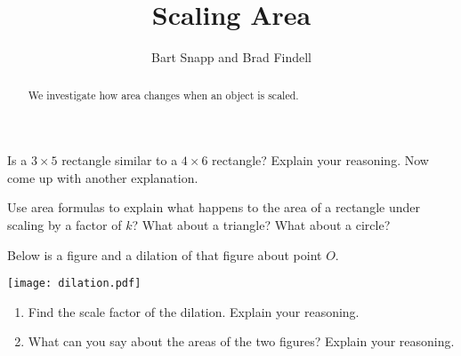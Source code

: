 \documentclass[nooutcomes]{ximera}
\title{Scaling Area}
\author{Bart Snapp and Brad Findell}
\begin{document}
\begin{abstract}
  We investigate how area changes when an object is scaled.
\end{abstract}
\maketitle


\begin{problem}
Is a $3\times 5$ rectangle similar to a $4\times 6$ rectangle?  Explain your reasoning.  Now come up with another explanation. 
\end{problem}

\vspace{.5in} 

\begin{problem}
Use area formulas to explain what happens to the area of a rectangle under scaling by a factor of $k$?  What about a triangle?  What about a circle?  
\end{problem}

\begin{problem}
Below is a figure and a dilation of that figure about point $O$.  
\begin{image}
\texttt{[image: dilation.pdf]}
\end{image}
\begin{enumerate}
\item Find the scale factor of the dilation.  Explain your reasoning. 
\item What can you say about the areas of the two figures?  Explain your reasoning. 
\end{enumerate}
\end{problem}


\end{document}

